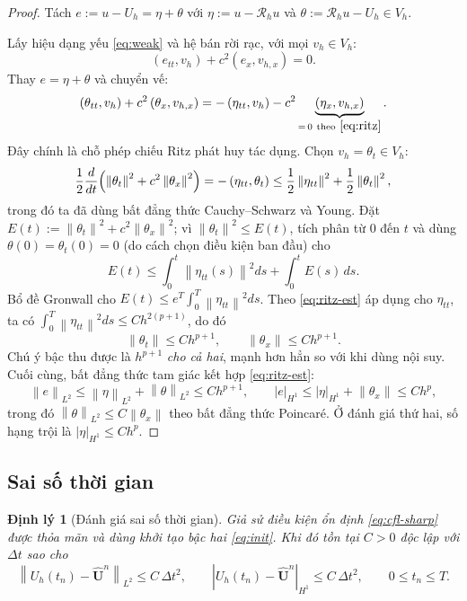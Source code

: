 \documentclass[11pt,a4paper]{article}
\theoremstyle{plain}
\newtheorem{theorem}{Định lý}[section]
\theoremstyle{definition}
\theoremstyle{remark}
\newcommand{\Hone}{H^{1}}
\newcommand{\Ltwo}{L^{2}}
\newcommand{\Vh}{V_{h}}
\newcommand{\Rh}{\mathcal{R}_{h}}
\newcommand{\dt}{\Delta t}
\newcommand{\norm}[1]{\left\lVert #1 \right\rVert}
\newcommand{\seminorm}[1]{\left\lvert #1 \right\rvert}
\newcommand{\ip}[2]{\left( #1 , #2 \right)}
\newcommand{\Uvec}{\bm{U}}
\begin{document}
\begin{proof}
Tách $e := u - U_{h} = \eta + \theta$ với
$\eta := u - \Rh u$ và $\theta := \Rh u - U_{h} \in \Vh$.

Lấy hiệu dạng yếu \eqref{eq:weak} và hệ bán rời rạc, với mọi
$v_{h} \in \Vh$:
\[
  \ip{e_{tt}}{v_{h}} + c^{2}\ip{e_{x}}{v_{h,x}} = 0 .
\]
Thay $e = \eta + \theta$ và chuyển vế:
\[
  \ip{\theta_{tt}}{v_{h}} + c^{2}\ip{\theta_{x}}{v_{h,x}}
  = -\ip{\eta_{tt}}{v_{h}} - c^{2}\underbrace{\ip{\eta_{x}}{v_{h,x}}}_{=\,0
    \ \text{theo}\ \eqref{eq:ritz}} .
\]
Đây chính là chỗ phép chiếu Ritz phát huy tác dụng. Chọn
$v_{h} = \theta_{t} \in \Vh$:
\[
  \frac{1}{2}\frac{d}{dt}
  \Bigl( \norm{\theta_{t}}^{2} + c^{2}\norm{\theta_{x}}^{2} \Bigr)
  = -\ip{\eta_{tt}}{\theta_{t}}
  \le \frac{1}{2}\norm{\eta_{tt}}^{2}
    + \frac{1}{2}\norm{\theta_{t}}^{2},
\]
trong đó ta đã dùng bất đẳng thức Cauchy--Schwarz và Young. Đặt
$E(t) := \norm{\theta_{t}}^{2} + c^{2}\norm{\theta_{x}}^{2}$; vì
$\norm{\theta_{t}}^{2} \le E(t)$, tích phân từ $0$ đến $t$ và dùng
$\theta(0) = \theta_{t}(0) = 0$ (do cách chọn điều kiện ban đầu) cho
\[
  E(t) \le \int_{0}^{t}\norm{\eta_{tt}(s)}^{2}ds
        + \int_{0}^{t} E(s)\,ds .
\]
Bổ đề Gronwall cho $E(t) \le e^{T}\int_{0}^{T}\norm{\eta_{tt}}^{2}ds$. Theo
\eqref{eq:ritz-est} áp dụng cho $\eta_{tt}$, ta có
$\int_{0}^{T}\norm{\eta_{tt}}^{2}ds \le Ch^{2(p+1)}$, do đó
\[
  \norm{\theta_{t}} \le Ch^{p+1},
  \qquad \norm{\theta_{x}} \le Ch^{p+1}.
\]
Chú ý bậc thu được là $h^{p+1}$ \emph{cho cả hai}, mạnh hơn hẳn so với khi
dùng nội suy. Cuối cùng, bất đẳng thức tam giác kết hợp \eqref{eq:ritz-est}:
\[
  \norm{e}_{\Ltwo} \le \norm{\eta}_{\Ltwo} + \norm{\theta}_{\Ltwo}
   \le Ch^{p+1},
  \qquad
  \seminorm{e}_{\Hone} \le \seminorm{\eta}_{\Hone} + \norm{\theta_{x}}
   \le Ch^{p},
\]
trong đó $\norm{\theta}_{\Ltwo} \le C\norm{\theta_{x}}$ theo bất đẳng thức
Poincaré. Ở đánh giá thứ hai, số hạng trội là
$\seminorm{\eta}_{\Hone} \le Ch^{p}$.
\end{proof}

\subsection{Sai số thời gian}

\begin{theorem}[Đánh giá sai số thời gian]
\label{thm:temporal}
Giả sử điều kiện ổn định \eqref{eq:cfl-sharp} được thỏa mãn và dùng khởi tạo
bậc hai \eqref{eq:init}. Khi đó tồn tại $C > 0$ độc lập với $\dt$ sao cho
\begin{equation}
\label{eq:temporal}
  \norm{U_{h}(t_{n}) - \hat{\Uvec}^{n}}_{\Ltwo} \le C\,\dt^{2},
  \qquad
  \seminorm{U_{h}(t_{n}) - \hat{\Uvec}^{n}}_{\Hone} \le C\,\dt^{2},
  \qquad 0 \le t_{n} \le T .
\end{equation}
\end{theorem}
\end{document}
